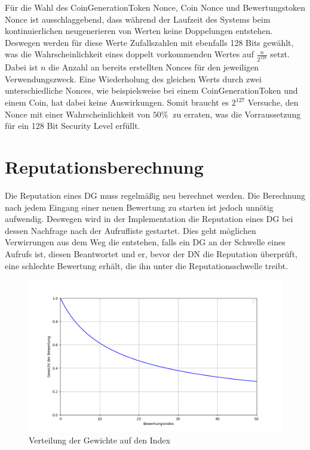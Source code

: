 \documentclass[
	fontsize=11pt,
	headings=small,
	parskip=half,           %
	bibliography=totoc,
	numbers=noenddot,       %
	open=any,               %
]{scrreprt}
\begin{document}
Für die Wahl des CoinGenerationToken Nonce, Coin Nonce und Bewertungstoken Nonce ist ausschlaggebend, dass während der Laufzeit des Systems beim kontinuierlichen neugenerieren von Werten keine Doppelungen entstehen. Deswegen werden für diese Werte Zufallszahlen mit ebenfalls 128 Bits gewählt, was die Wahrscheinlichkeit eines doppelt vorkommenden Wertes auf $\frac{n}{2^{128}}$ setzt. Dabei ist $n$ die Anzahl an bereits erstellten Nonces für den jeweiligen Verwendungszweck. Eine Wiederholung des gleichen Werts durch zwei unterschiedliche Nonces, wie beispielsweise bei einem CoinGenerationToken und einem Coin, hat dabei keine Auswirkungen. Somit braucht es $2^{127}$ Versuche, den Nonce mit einer Wahrscheinlichkeit von $50\%\ $ zu erraten, was die Vorraussetzung für ein 128 Bit Security Level erfüllt.

\section{Reputationsberechnung}
Die Reputation eines DG muss regelmäßig neu berechnet werden. Die Berechnung nach jedem Eingang einer neuen Bewertung zu starten ist jedoch unnötig aufwendig. Deswegen wird in der Implementation die Reputation eines DG bei dessen Nachfrage nach der Aufrufliste gestartet. Dies geht möglichen Verwirrungen aus dem Weg die entstehen, falls ein DG an der Schwelle eines Aufrufs ist, diesen Beantwortet und er, bevor der DN die Reputation überprüft, eine schlechte Bewertung erhält, die ihn unter die Reputationsschwelle treibt.

\begin{figure}[h]
    \centering
    \caption{Verteilung der Gewichte auf den Index}
    \label{fig:reputationWeights}
    \includegraphics[width=0.8\linewidth]{ReputationWeights.png}
\end{figure}
\end{document}
